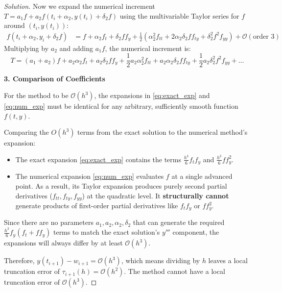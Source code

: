\documentclass[11pt, a4paper]{article}
\newif\ifsolutionnewpage
\newenvironment{solution}
  {\begin{proof}[Solution]}
  {\end{proof}\ifsolutionnewpage\newpage\fi}
\begin{document}
\begin{solution}
            Now we expand the numerical increment $T = a_1 f + a_2 f(t_i + \alpha_2, y(t_i) + \delta_2 f)$ using the multivariable Taylor series for $f$ around $(t_i, y(t_i))$:
            \begin{align*}
            f(t_i + \alpha_2, y_i + \delta_2 f) &= f + \alpha_2 f_t + \delta_2 f f_y + \frac{1}{2} \left( \alpha_2^2 f_{tt} + 2\alpha_2 \delta_2 f f_{ty} + \delta_2^2 f^2 f_{yy} \right) + \mathcal{O}(\text{order } 3)
            \end{align*}
            Multiplying by $a_2$ and adding $a_1 f$, the numerical increment is:
            \begin{equation} \label{eq:num_exp}
            T = (a_1 + a_2)f + a_2 \alpha_2 f_t + a_2 \delta_2 f f_y + \frac{1}{2} a_2 \alpha_2^2 f_{tt} + a_2 \alpha_2 \delta_2 f f_{ty} + \frac{1}{2} a_2 \delta_2^2 f^2 f_{yy} + \dots
            \end{equation}
            
            \vspace{0.3cm}
            \textbf{3. Comparison of Coefficients}
            
            For the method to be $\mathcal{O}(h^3)$, the expansions in \eqref{eq:exact_exp} and \eqref{eq:num_exp} must be identical for any arbitrary, sufficiently smooth function $f(t,y)$. 
            
            Comparing the $O(h^3)$ terms from the exact solution to the numerical method's expansion:
            \begin{itemize}
                \item The exact expansion \eqref{eq:exact_exp} contains the terms $\frac{h^3}{6} f_t f_y$ and $\frac{h^3}{6} f f_y^2$.
                \item The numerical expansion \eqref{eq:num_exp} evaluates $f$ at a single advanced point. As a result, its Taylor expansion produces purely second partial derivatives ($f_{tt}, f_{ty}, f_{yy}$) at the quadratic level. It \textbf{structurally cannot} generate products of first-order partial derivatives like $f_t f_y$ or $f f_y^2$.
            \end{itemize}
            
            Since there are no parameters $a_1, a_2, \alpha_2, \delta_2$ that can generate the required $\frac{h^3}{6} f_y(f_t + f f_y)$ terms to match the exact solution's $y'''$ component, the expansions will always differ by at least $\mathcal{O}(h^3)$. 
            
            Therefore, $y(t_{i+1}) - w_{i+1} = \mathcal{O}(h^3)$, which means dividing by $h$ leaves a local truncation error of $\tau_{i+1}(h) = \mathcal{O}(h^2)$. The method cannot have a local truncation error of $\mathcal{O}(h^3)$.
            \end{solution}
\end{document}

